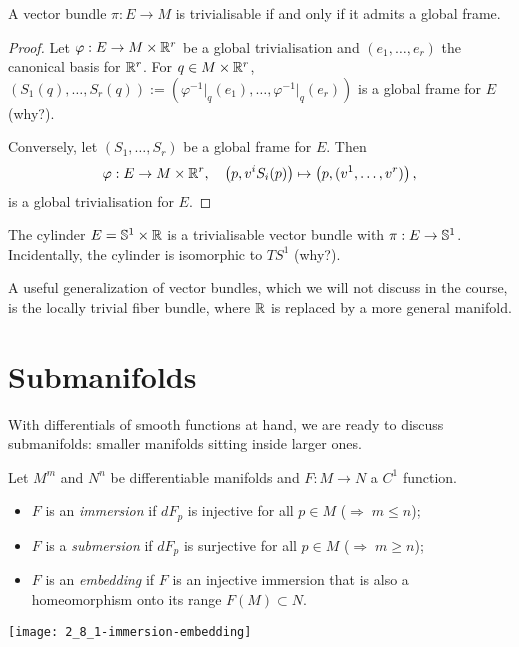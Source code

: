 \begin{proposition}\label{prop:trivialisable}
  A vector bundle $\pi: E\to M$ is trivialisable if and only if it admits a global frame.
\end{proposition}
\begin{proof}
  Let $\varphi: E \to M\times\mathbb{R}^r$ be a global trivialisation and $(e_1, \ldots, e_r)$ the canonical basis for $\mathbb{R}^r$.
  For $q\in M\times\mathbb{R}^r$, $(S_1(q), \ldots, S_r(q)) := \left(\varphi^{-1}\big|_q(e_1), \ldots, \varphi^{-1}\big|_q(e_r) \right)$ is a global frame for $E$ (why?).

  Conversely, let $(S_1, \ldots, S_r)$ be a global frame for $E$. Then
  \begin{equation}
    \varphi: E \to M\times\mathbb{R}^r, \quad
    \left(p, v^i S_i(p)\right) \mapsto \left(p, (v^1, \ldots, v^r)\right),
  \end{equation}
  is a global trivialisation for $E$.
\end{proof}

\begin{example}
  The cylinder $E = \mathbb{S}^1\times\mathbb{R}$ is a trivialisable vector bundle with $\pi:E\to \mathbb{S}^1$.
  Incidentally, the cylinder is isomorphic to $TS^1$ (why?).
\end{example}

A useful generalization of vector bundles, which we will not discuss in the course, is the locally trivial fiber bundle, where $\mathbb{R}$ is replaced by a more general manifold.

\section{Submanifolds}

With differentials of smooth functions at hand, we are ready to discuss submanifolds: smaller manifolds sitting inside larger ones.

\begin{definition}
  Let $M^m$ and $N^n$ be differentiable manifolds and $F:M\to N$ a $C^1$ function.
  \begin{itemize}
    \item $F$ is an \emph{immersion} if $dF_p$ is injective for all $p\in M$ ($\Rightarrow\; m\leq n$);
    \item $F$ is a \emph{submersion} if $dF_p$ is surjective for all $p\in M$ ($\Rightarrow\; m\geq n$);
    \item $F$ is an \emph{embedding} if $F$ is an injective immersion that is also a homeomorphism onto its range $F(M)\subset N$.
  \end{itemize}
\end{definition}
\begin{marginfigure}
  \texttt{[image: 2\_8\_1-immersion-embedding]}
\end{marginfigure}

